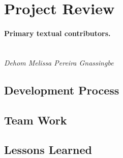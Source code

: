 \section{Project Review}
\label{sec:project review}

\paragraph{Primary textual contributors.}
\mbox{}\\\emph{Dehom Melissa Pereira Gnassingbe}

\subsection{Development Process}


\subsection{Team Work}


\subsection{Lessons Learned}




